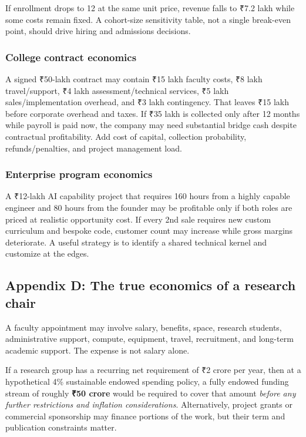 If enrollment drops to 12 at the same unit price, revenue falls to \textnormal{₹}7.2 lakh while some costs remain fixed. A cohort-size sensitivity table, not a single break-even point, should drive hiring and admissions decisions.

\subsubsection*{College contract economics}

A signed \textnormal{₹}50-lakh contract may contain \textnormal{₹}15 lakh faculty costs, \textnormal{₹}8 lakh travel/\allowbreak support, \textnormal{₹}4 lakh assessment/\allowbreak technical services, \textnormal{₹}5 lakh sales/\allowbreak implementation overhead, and \textnormal{₹}3 lakh contingency. That leaves \textnormal{₹}15 lakh before corporate overhead and taxes. If \textnormal{₹}35 lakh is collected only after 12 months while payroll is paid now, the company may need substantial bridge cash despite contractual profitability. Add cost of capital, collection probability, refunds/\allowbreak penalties, and project management load.

\subsubsection*{Enterprise program economics}

A \textnormal{₹}12-lakh AI capability project that requires 160 hours from a highly capable engineer and 80 hours from the founder may be profitable only if both roles are priced at realistic opportunity cost. If every 2nd sale requires new custom curriculum and bespoke code, customer count may increase while gross margins deteriorate. A useful strategy is to identify a shared technical kernel and customize at the edges.

\subsection{Appendix D: The true economics of a research chair}

A faculty appointment may involve salary, benefits, space, research students, administrative support, compute, equipment, travel, recruitment, and long-term academic support. The expense is not salary alone.

If a research group has a recurring net requirement of \textnormal{₹}2 crore per year, then at a hypothetical 4\% sustainable endowed spending policy, a fully endowed funding stream of roughly \textbf{\textnormal{₹}50 crore} would be required to cover that amount \textit{before any further restrictions and inflation considerations}. Alternatively, project grants or commercial sponsorship may finance portions of the work, but their term and publication constraints matter.

